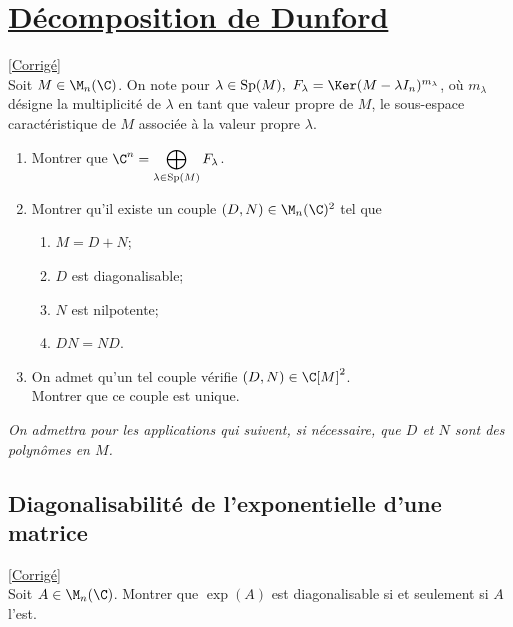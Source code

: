 \documentclass[8pt]{book}
\begin{document}
\section{\underline{Décomposition de Dunford} }
\label{Décomposition de Dunford}
\textcolor{blue}{\hyperref[Décomposition de Dunford corrigé]{[Corrigé]}}\\
Soit $M\in \M_n(\C)$. On note pour $\lambda\in \text{Sp}(M),\ F_\lambda=\Ker(M-\lambda I_n)^{m_\lambda}$, où $m_\lambda$ désigne la multiplicité de $\lambda$ en tant que valeur propre de $M$, le sous-espace caractéristique de $M$ associée à la valeur propre $\lambda$.
\begin{enumerate}
	\item Montrer que $\C^n=\displaystyle\bigoplus_{\lambda\in \text{Sp}(M)}F_\lambda$.
	\item Montrer qu'il existe un couple $(D,N)\in \M_n(\C)^2$ tel que
	\begin{enumerate}[label=(\roman*)]
		\item $M=D+N$;
		\item $D$ est diagonalisable;
		\item $N$ est nilpotente;
		\item $DN=ND$.
	\end{enumerate}
	\item On admet qu'un tel couple vérifie $(D,N)\in \C[M]^2$.\\
	Montrer que ce couple est unique.
\end{enumerate}
\textit{On admettra pour les applications qui suivent, si nécessaire, que $D$ et $N$ sont des polynômes en $M$.}

\subsection{Diagonalisabilité de l'exponentielle d'une matrice }
\label{Diagonalisabilité de l'exponentielle d'une matrice}
\textcolor{blue}{\hyperref[Diagonalisabilité de l'exponentielle d'une matrice corrigé]{[Corrigé]}}\\
Soit $A\in \M_n(\C)$. Montrer que $\exp(A)$ est diagonalisable si et seulement si $A$ l'est.
\end{document}
